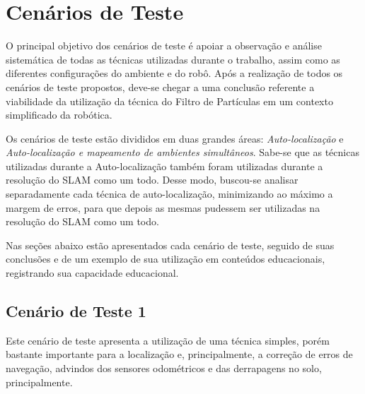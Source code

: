 \chapter[Cenários de Teste]{Cenários de Teste}

O principal objetivo dos cenários de teste é apoiar a observação e análise sistemática de todas as técnicas utilizadas durante o trabalho, assim como as diferentes configurações do ambiente e do robô. Após a realização de todos os cenários de teste propostos, deve-se chegar a uma conclusão referente a viabilidade da utilização da técnica do Filtro de Partículas em um contexto simplificado da robótica. 

Os cenários de teste estão divididos em duas grandes áreas: \textit{Auto-localização} e \textit{Auto-localização e mapeamento de ambientes simultâneos}. Sabe-se que as técnicas utilizadas durante a Auto-localização também foram utilizadas durante a resolução do SLAM como um todo. Desse modo, buscou-se analisar separadamente cada técnica de auto-localização, minimizando ao máximo a margem de erros, para que depois as mesmas pudessem ser utilizadas na resolução do SLAM como um todo.

Nas seções abaixo estão apresentados cada cenário de teste, seguido de suas conclusões e de um exemplo de sua utilização em conteúdos educacionais, registrando sua capacidade educacional.

\section{Cenário de Teste 1} %
\label{sec:cenario1}

	Este cenário de teste apresenta a utilização de uma técnica simples, porém bastante importante para a localização e, principalmente, a correção de erros de navegação, advindos dos sensores odométricos e das derrapagens no solo, principalmente.

